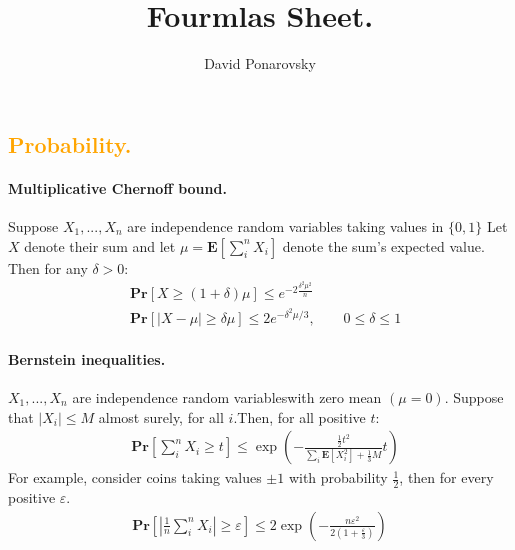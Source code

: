 \documentclass{article}
\newcommand{\prb}[1]{ \mathbf{Pr} \left[ {#1} \right]}
\newcommand{\expp}[1]{ \mathbf{E} \left[ {#1} \right]}
\newcommand{\indpr}{$ X_1, ..., X_n$ are independence random variables}
\begin{document}
\title{Fourmlas Sheet.} 
\author{David Ponarovsky}
\maketitle
\begin{multicols*}{2}
  \subsection*{{\textcolor{orange}{Probability.}} } 
\paragraph{Multiplicative Chernoff bound.} Suppose $ X_1, ..., X_n$ are independence random variables taking values in $\{0, 1\}$ Let $X$ denote their sum and let $\mu = \expp{\sum_{i}^{n}{X_{i}}} $  denote the sum's expected value. Then for any $\delta > 0$: 
\begin{equation*}
    \begin{split}
     & \prb{X \ge \left( 1+\delta \right) \mu }  \le e^{-2\frac{\delta^2\mu^{2}}{n}} \\ 
     & \prb{|X - \mu| \ge \delta\mu }  \le 2e^{-\delta^2\mu/3}, \qquad 0 \le \delta \le 1
    \end{split}
  \end{equation*}
  \paragraph{Bernstein inequalities.} \indpr with zero mean $\left( \mu = 0  \right)$. Suppose that $|X_{i}| \le M $ almost surely, for all $i$.Then, for all positive $t$:
  \begin{equation*}
    \begin{split}
      & \prb{ \sum^{n}_{i}{X_i} \ge t  } \le \exp\left( -\frac{\frac{1}{2}t^{2}}{\sum_{i}{\expp{X_{i}^{2}}} + \frac{1}{3}M}t \right)
    \end{split}
  \end{equation*} For example, consider coins taking values $\pm 1$ with probability $\frac{1}{2}$, then for every positive $\varepsilon$. 
  \begin{equation*}
    \begin{split}
      \prb{ | \frac{1}{n}\sum_{i}^{n}{X_i} | \ge \varepsilon  } \le 2\exp\left( -\frac{n\varepsilon^{2}}{2\left( 1+\frac{\varepsilon}{3} \right)} \right) 
    \end{split}
  \end{equation*}

\end{multicols*}
\end{document}
